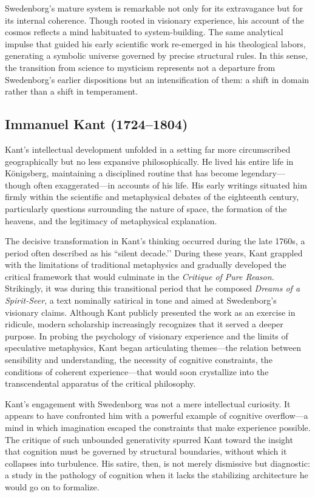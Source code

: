 \documentclass[12pt]{article}
\begin{document}
Swedenborg’s mature system is remarkable not only for its extravagance but for 
its internal coherence. Though rooted in visionary experience, his account of 
the cosmos reflects a mind habituated to system-building. The same analytical 
impulse that guided his early scientific work re-emerged in his theological 
labors, generating a symbolic universe governed by precise structural rules. 
In this sense, the transition from science to mysticism represents not a 
departure from Swedenborg’s earlier dispositions but an intensification of 
them: a shift in domain rather than a shift in temperament.

\subsection{Immanuel Kant (1724--1804)}

Kant’s intellectual development unfolded in a setting far more circumscribed 
geographically but no less expansive philosophically. He lived his entire life 
in Königsberg, maintaining a disciplined routine that has become 
legendary—though often exaggerated—in accounts of his life. His early writings 
situated him firmly within the scientific and metaphysical debates of the 
eighteenth century, particularly questions surrounding the nature of space, the 
formation of the heavens, and the legitimacy of metaphysical explanation.

The decisive transformation in Kant’s thinking occurred during the late 1760s, 
a period often described as his ``silent decade.’’ During these years, Kant 
grappled with the limitations of traditional metaphysics and gradually 
developed the critical framework that would culminate in the \emph{Critique of 
Pure Reason}.  
Strikingly, it was during this transitional period that he composed 
\emph{Dreams of a Spirit-Seer}, a text nominally satirical in tone and aimed at 
Swedenborg’s visionary claims. Although Kant publicly presented the work as an 
exercise in ridicule, modern scholarship increasingly recognizes that it served 
a deeper purpose. In probing the psychology of visionary experience and the 
limits of speculative metaphysics, Kant began articulating themes—the relation 
between sensibility and understanding, the necessity of cognitive 
constraints, the conditions of coherent experience—that would soon crystallize 
into the transcendental apparatus of the critical philosophy.

Kant’s engagement with Swedenborg was not a mere intellectual curiosity.  
It appears to have confronted him with a powerful example of cognitive 
overflow—a mind in which imagination escaped the constraints that make 
experience possible. The critique of such unbounded generativity spurred 
Kant toward the insight that cognition must be governed by structural 
boundaries, without which it collapses into turbulence. His satire, then, is 
not merely dismissive but diagnostic: a study in the pathology of cognition 
when it lacks the stabilizing architecture he would go on to formalize.
\end{document}
